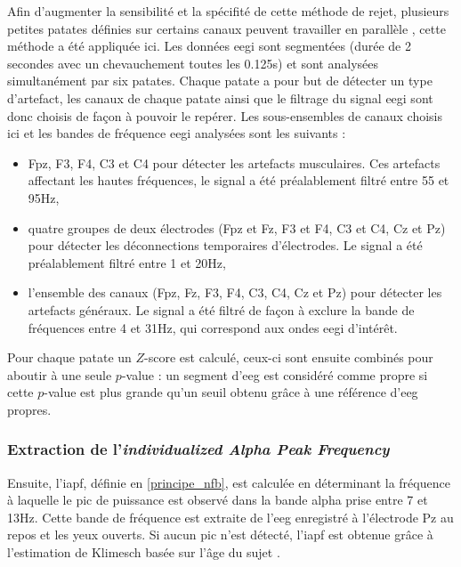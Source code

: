 Afin d'augmenter la sensibilité et la spécifité de cette méthode de rejet, plusieurs petites patates définies sur certains canaux peuvent travailler en parallèle \citep{Barthelemy2019}, 
cette méthode a été appliquée ici.
Les données \gls{eegi} sont segmentées (durée de 2 secondes avec un chevauchement toutes les 0.125s) et sont analysées simultanément par six patates. Chaque patate a pour but de détecter 
un type d'artefact, les canaux de chaque patate ainsi que le filtrage du signal \gls{eegi} sont donc choisis de façon à pouvoir le repérer. 
Les sous-ensembles de canaux choisis ici et les bandes de fréquence \gls{eegi} analysées sont les suivants :
\begin{itemize}
\item Fpz, F3, F4, C3 et C4 pour détecter les artefacts musculaires. Ces artefacts affectant les hautes fréquences, le signal a été préalablement filtré entre 55 et 95Hz,
\item quatre groupes de deux électrodes (Fpz et Fz, F3 et F4, C3 et C4, Cz et Pz) pour détecter les déconnections temporaires d'électrodes. Le signal a été préalablement filtré entre 1 et 20Hz, 
\item l'ensemble des canaux (Fpz, Fz, F3, F4, C3, C4, Cz et Pz) pour détecter les artefacts généraux. Le signal a été filtré de façon à exclure la bande de fréquences entre 4 et 31Hz, qui correspond
aux ondes \gls{eegi} d'intérêt.
\end{itemize}
Pour chaque patate un $Z$-score est calculé, ceux-ci sont ensuite combinés pour aboutir à une seule $p$-value : un segment d'\gls{eeg} est considéré comme propre si cette $p$-value est 
plus grande qu'un seuil obtenu grâce à une référence d'\gls{eeg} propres. 

\subsubsection{Extraction de l'\textit{individualized Alpha Peak Frequency}} \label{extraction_iapf}
Ensuite, l'\gls{iapf}, définie en \ref{principe_nfb}, est calculée en déterminant la fréquence à laquelle le pic de puissance est observé dans la bande alpha prise entre 7 et 13Hz.
Cette bande de fréquence est extraite de l'\gls{eeg} enregistré à l'électrode Pz au repos et les yeux ouverts. 
Si aucun pic n'est détecté, l'\gls{iapf} est obtenue grâce à l'estimation de Klimesch basée sur l'âge du sujet \citep{Klimesch1999}. 


